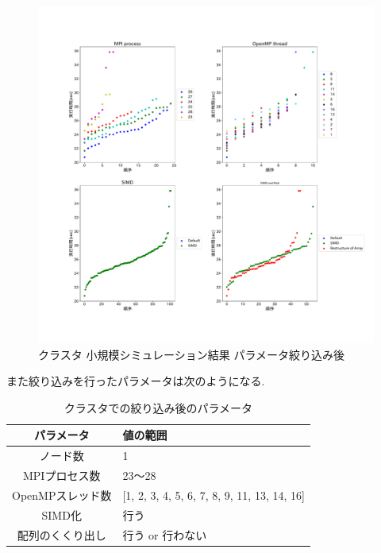 \begin{figure}[htb]
\begin{center}
    \includegraphics[width=1.2\textwidth]{./images/cluster-bench-adjusted-final.pdf}
    \caption{クラスタ 小規模シミュレーション結果 パラメータ絞り込み後}
    \label{fig:cluster-bench-adjusted-final}
\end{center}
\end{figure}
また絞り込みを行ったパラメータは次のようになる.\\
\begin{table}[htb]
  \caption {クラスタでの絞り込み後のパラメータ}
  \begin{center}
    \begin{tabular}{|c|p{12cm}|}
      \hline
      パラメータ & 値の範囲\\ \hline
      ノード数 & 1\\ \hline
      MPIプロセス数 & 23〜28\\ \hline
      OpenMPスレッド数 & [1, 2, 3, 4, 5, 6, 7, 8, 9, 11, 13, 14, 16]\\ \hline
      SIMD化 & 行う\\ \hline
      配列のくくり出し & 行う or 行わない\\ \hline
    \end{tabular}
  \end{center}
\end{table}

